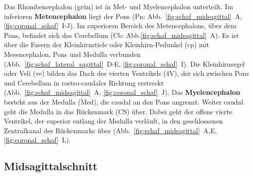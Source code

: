 \documentclass[12pt,a4paper,pdftex]{article}
\begin{document}
\noindent Das Rhombencephalon (grün) ist in Met- und Myelencephalon unterteilt. Im inferioren \textbf{Metencephalon} liegt der Pons (Pn: Abb.~\ref{fig:schaf_midsagittal}~A, \ref{fig:coronal_schaf}~I-J). Im superioren Bereich des Metencephalons, über dem Pons, befindet sich das Cerebellum (Cb: Abb.\ref{fig:schaf_midsagittal}~A). Es ist über die Fasern der Kleinhirnstiele oder Kleinhirn-Pedunkel (cp) mit Mesencephalon, Pons und Medulla verbunden (Abb.~\ref{fig:schaf_lateral_sagittal}~D-E, \ref{fig:coronal_schaf}~I). Die Kleinhirnsegel oder Veli (ve) bilden das Dach des vierten Ventrikels (4V), der sich zwischen Pons und Cerebellum in rostro-caudaler Richtung erstreckt (Abb.~\ref{fig:schaf_midsagittal}~A, \ref{fig:coronal_schaf}~J). Das \textbf{Myelencephalon} besteht aus der Medulla (Med), die caudal an den Pons angrenzt. Weiter caudal geht die Medulla in das Rückenmark (CS) über. Dabei geht der offene vierte Ventrikel, der superior entlang der Medulla verläuft, in den geschlossenen Zentralkanal des Rückenmarks über (Abb.~\ref{fig:schaf_midsagittal}~A,E, \ref{fig:coronal_schaf}~L).



\newpage
\subsection{Midsagittalschnitt}
\label{subsec:midsagittal}
\end{document}
